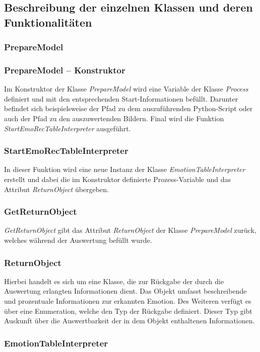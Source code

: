 \documentclass[12pt,a4paper,headinclude,twoside, plainheadsepline, open=right,numbers=noenddot]{scrreprt}
\begin{document}
\subsection{Beschreibung der einzelnen Klassen und deren Funktionalit\"{a}ten}
\subsubsection{PrepareModel}
\subsubsection{PrepareModel – Konstruktor}
Im Konstruktor der Klasse \textit{PrepareModel} wird eine Variable der Klasse \textit{Process} definiert und mit den entsprechenden Start-Informationen bef\"{u}llt. Darunter befindet sich beispielsweise der Pfad zu dem auszuf\"{u}hrenden Python-Script oder auch der Pfad zu den auszuwertenden Bildern. Final wird die Funktion \textit{StartEmoRecTableInterpreter} ausgef\"{u}hrt.
\subsubsection{StartEmoRecTableInterpreter}
In dieser Funktion wird eine neue Instanz der Klasse \textit{EmotionTableInterpreter} erstellt und dabei die im Konstruktor definierte Prozess-Variable und das Attribut \textit{ReturnObject} \"{u}bergeben.
\subsubsection{GetReturnObject}
\textit{GetReturnObject} gibt das Attribut \textit{ReturnObject} der Klasse \textit{PrepareModel} zur\"{u}ck, welches w\"{a}hrend der Auswertung bef\"{u}llt wurde. 
\subsubsection{ReturnObject}
Hierbei handelt es sich um eine Klasse, die zur R\"{u}ckgabe der durch die Auswertung erlangten Informationen dient. Das Objekt umfasst beschreibende und prozentuale Informationen zur erkannten Emotion. Des Weiteren verf\"{u}gt es \"{u}ber eine Enumeration, welche den Typ der R\"{u}ckgabe definiert. Dieser Typ gibt Auskunft \"{u}ber die Auswertbarkeit der in dem Objekt enthaltenen Informationen.
\subsubsection{EmotionTableInterpreter}
\end{document}
